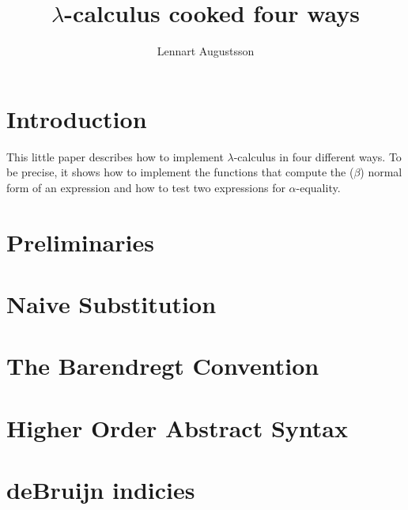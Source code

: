 \documentclass{article}
\date{}
\title{
$\lambda$-calculus cooked four ways
}
\author{
Lennart Augustsson
}
\begin{document}
\maketitle


\section{Introduction}
This little paper describes how to implement $\lambda$-calculus in
four different ways.  To be precise, it shows how to implement the
functions that compute the ($\beta$) normal form of an expression
and how to test two expressions for $\alpha$-equality.

\section{Preliminaries}




\section{Naive Substitution}


\section{The Barendregt Convention}


\section{Higher Order Abstract Syntax}


\section{deBruijn indicies}

\end{document}
